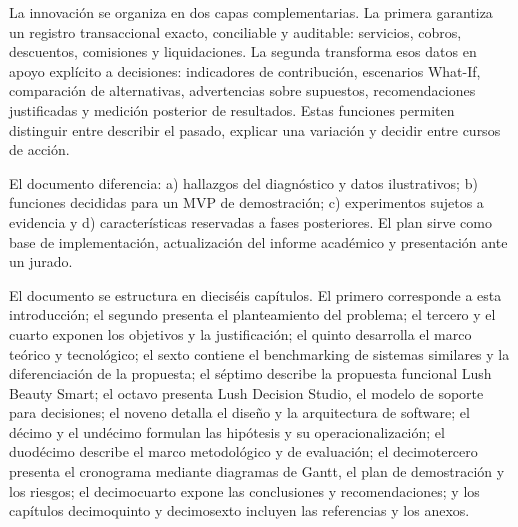 La innovación se organiza en dos capas complementarias. La primera garantiza un registro transaccional exacto, conciliable y auditable: servicios, cobros, descuentos, comisiones y liquidaciones. La segunda transforma esos datos en apoyo explícito a decisiones: indicadores de contribución, escenarios What-If, comparación de alternativas, advertencias sobre supuestos, recomendaciones justificadas y medición posterior de resultados. Estas funciones permiten distinguir entre describir el pasado, explicar una variación y decidir entre cursos de acción.


El documento diferencia: a) hallazgos del diagnóstico y datos ilustrativos; b) funciones decididas para un MVP de demostración; c) experimentos sujetos a evidencia y d) características reservadas a fases posteriores. El plan sirve como base de implementación, actualización del informe académico y presentación ante un jurado.


El documento se estructura en dieciséis capítulos. El primero corresponde a esta introducción; el segundo presenta el planteamiento del problema; el tercero y el cuarto exponen los objetivos y la justificación; el quinto desarrolla el marco teórico y tecnológico; el sexto contiene el benchmarking de sistemas similares y la diferenciación de la propuesta; el séptimo describe la propuesta funcional Lush Beauty Smart; el octavo presenta Lush Decision Studio, el modelo de soporte para decisiones; el noveno detalla el diseño y la arquitectura de software; el décimo y el undécimo formulan las hipótesis y su operacionalización; el duodécimo describe el marco metodológico y de evaluación; el decimotercero presenta el cronograma mediante diagramas de Gantt, el plan de demostración y los riesgos; el decimocuarto expone las conclusiones y recomendaciones; y los capítulos decimoquinto y decimosexto incluyen las referencias y los anexos.
